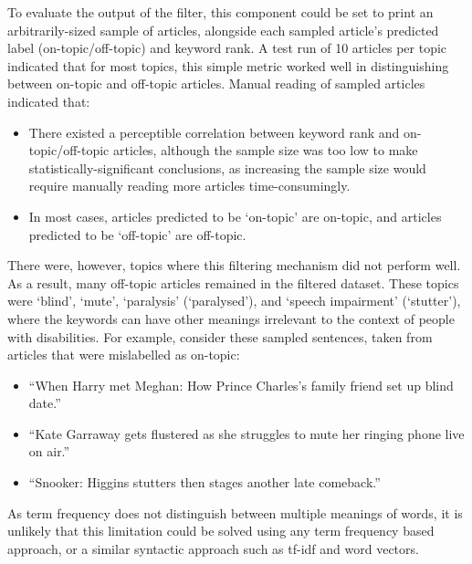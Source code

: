\documentclass{report}
\begin{document}
To evaluate the output of the filter, this component could be set to print an arbitrarily-sized sample of articles, alongside each sampled article's predicted label (on-topic/off-topic) and keyword rank.
A test run of 10 articles per topic indicated that for most topics, this simple metric worked well in distinguishing between on-topic and off-topic articles.
Manual reading of sampled articles indicated that:
\begin{itemize}
	\item There existed a perceptible correlation between keyword rank and on-topic/off-topic articles, although the sample size was too low to make statistically-significant conclusions, as increasing the sample size would require manually reading more articles time-consumingly.
	\item In most cases, articles predicted to be `on-topic' are on-topic, and articles predicted to be `off-topic' are off-topic.
\end{itemize}

There were, however, topics where this filtering mechanism did not perform well.
As a result, many off-topic articles remained in the filtered dataset.
These topics were `blind', `mute', `paralysis' (`paralysed'), and `speech impairment' (`stutter'), where the keywords can have other meanings irrelevant to the context of people with disabilities.
For example, consider these sampled sentences, taken from articles that were mislabelled as on-topic:
\begin{itemize}
	\item ``When Harry met Meghan: How Prince Charles's family friend set up blind date.''
	\item ``Kate Garraway gets flustered as she struggles to mute her ringing phone live on air.''
	\item ``Snooker: Higgins stutters then stages another late comeback.''
\end{itemize}
As term frequency does not distinguish between multiple meanings of words, it is unlikely that this limitation could be solved using any term frequency based approach, or a similar syntactic approach such as tf-idf and word vectors.
\end{document}
